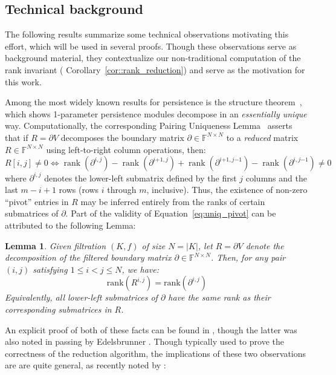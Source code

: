 \documentclass[pdflatex,sn-mathphys-num]{sn-jnl}
\newtheorem{lemma}{Lemma}
\begin{document}
\subsection{Technical background}\label{sec:betti_derivation}
The following results summarize some technical observations motivating this effort, which will be used in several proofs. Though these observations serve as background material, they contextualize our non-traditional computation of the rank invariant ( Corollary~\ref{cor::rank_reduction}) and serve as the motivation for this work.

Among the most widely known results for persistence is the structure theorem~\cite{zomorodian2004computing}, which shows 1-parameter persistence modules decompose in an \emph{essentially unique} way. Computationally, the corresponding Pairing Uniqueness Lemma~\cite{cohen2006vines} asserts that if \(R = \partial V\) decomposes the boundary matrix \(\partial \in \mathbb{F}^{N \times N}\) to a \emph{reduced} matrix \(R \in \mathbb{F}^{N \times N}\) using left-to-right column operations, then:
\begin{equation}
	R [i,j]  \neq 0 \Leftrightarrow \operatorname{rank} \left( \partial^{i,j} \right)  - \operatorname{rank} \left( \partial^{i\mathtt{+}1,j} \right)  + \operatorname{rank} \left( \partial^{i\mathtt{+}1,j\mathrm{-}1} \right)  - \operatorname{rank} \left( \partial^{i,j\mathrm{-}1} \right)  \neq 0
\end{equation}\label{eq:uniq_pivot}
\noindent
where \(\partial^{i,j}\) denotes the lower-left submatrix defined by the first \(j\) columns and the last \(m - i + 1\) rows (rows \(i\) through \(m\), inclusive). Thus, the existence of non-zero ``pivot'' entries in \(R\) may be inferred entirely from the ranks of certain submatrices of \(\partial\). Part of the validity of Equation~\ref{eq:uniq_pivot} can be attributed to the following Lemma:
\begin{lemma}\label{lemma:rank}
		Given filtration $(K , f)$ of size $N = \lvert K \rvert$, let $R = \partial V$ denote the decomposition of the filtered boundary matrix $\partial \in \mathbb{F}^{N \times N}$. Then, for any pair $(i , j)$ satisfying $1 \leq i < j \leq N$, we have: 
		\begin{equation}\label{eq:lower_left_rank}
			\mathrm{rank} (R^{i, j}) = \mathrm{rank}(\partial^{i , j}) 
		\end{equation}
		Equivalently, all lower-left submatrices of $\partial$ have the same rank as their corresponding submatrices in $R$.
\end{lemma}
\noindent An explicit proof of both of these facts can be found in \cite{dey2022computational}, though the latter was also noted in passing by Edelsbrunner \cite{edelsbrunner2000topological}. Though typically used to prove the correctness of the reduction algorithm, the implications of these two observations are are quite general, as recently noted by \cite{bauer2022keeping}:
\end{document}

